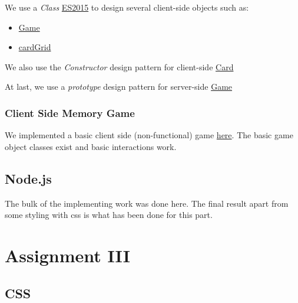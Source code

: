 \documentclass{article}
\begin{document}
We use a \textit{Class} \href{https://developer.mozilla.org/en-US/docs/Web/JavaScript/Reference/Classes}{ES2015} to design several client-side objects such as: 

\begin{itemize}
    \item \href{https://github.com/mennohie/memory-project-webdb/blob/34a6ba670b041a60b2915c33ae894a1768a40f82/memorio/public/javascripts/game.js}{Game}
    \item \href{https://github.com/mennohie/memory-project-webdb/blob/34a6ba670b041a60b2915c33ae894a1768a40f82/memorio/public/javascripts/cardGrid.js}{cardGrid}
\end{itemize}

We also use the \textit{Constructor} design pattern for client-side \href{https://github.com/mennohie/memory-project-webdb/blob/34a6ba670b041a60b2915c33ae894a1768a40f82/memorio/public/javascripts/cardGrid.js}{Card}

At last, we use a \textit{prototype} design pattern for server-side \href{https://github.com/mennohie/memory-project-webdb/blob/34a6ba670b041a60b2915c33ae894a1768a40f82/memorio/game.js}{Game}

\subsubsection{Client Side Memory Game}

We implemented a basic client side (non-functional) game \href{https://github.com/mennohie/memory-project-webdb/commit/6b39c67993f45905e8d1d087a9392466e1f71779}{here}. The basic game object classes exist and basic interactions work.

\subsection{Node.js}

The bulk of the implementing work was done here. The final result apart from some styling with css is what has been done for this part.

\pagebreak
\section{Assignment III}

\subsection{CSS}
\end{document}
